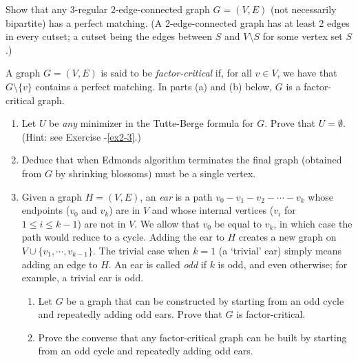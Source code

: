 \documentclass[12pt]{article}
\begin{document}
\begin{exercises}
\item  Show that any 3-regular 2-edge-connected graph $G=(V,E)$ (not
  necessarily bipartite)
 has a perfect matching.  (A 2-edge-connected graph has at least 2 edges in
  every cutset; a cutset being the edges between $S$ and $V\setminus
  S$ for some vertex set $S$.) 

\item
A graph $G=(V,E)$ is said to be {\it factor-critical} if, for all
$v\in V$, we have that $G\setminus \{v\}$ contains a perfect
matching. In parts (a) and (b) below, $G$ is a factor-critical graph.
\begin{enumerate}
\item
Let $U$ be {\it any} minimizer in the
Tutte-Berge formula for $G$. Prove that $U=\emptyset$. (Hint: see
Exercise \thechapnum-\ref{ex2-3}.)
\item
Deduce that when Edmonds algorithm terminates the final graph
(obtained from $G$ by shrinking blossoms) must be a single vertex. 
\item
Given a graph $H=(V,E)$, an {\it ear} is a path
$v_0-v_1-v_2-\cdots-v_k$ whose endpoints ($v_0$ and $v_k$) are in
$V$ and whose internal vertices ($v_i$ for $1\leq i \leq k-1$) are not
in $V$. We allow that $v_0$ be equal to $v_k$, in which case the path
would reduce to a cycle. Adding the ear to $H$ creates a new graph on
$V\cup\{v_1,\cdots,v_{k-1}\}$. The trivial case when $k=1$ (a `trivial' ear) simply
means adding an edge to $H$. An ear is called {\it odd} if $k$ is odd, and
even otherwise; for example, a trivial ear is odd. 
 \begin{enumerate}
\item 
Let $G$ be a graph that can be constructed by starting from an odd
cycle and repeatedly adding odd ears. Prove that $G$ is
factor-critical. 
\item 
Prove the converse that any factor-critical graph can be built by starting from an
odd cycle and repeatedly adding odd ears.
\end{enumerate}
 \end{enumerate}
\end{exercises}
\end{document}
